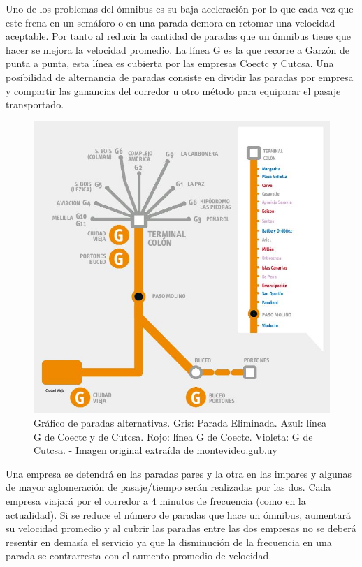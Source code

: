 Uno de los problemas del ómnibus es su baja aceleración por lo que cada vez que este frena en un semáforo o en una parada demora en retomar una velocidad aceptable. Por tanto al reducir la cantidad de paradas que un ómnibus tiene que hacer se mejora la velocidad promedio.
La línea G es la que recorre a Garzón de punta a punta, esta línea es cubierta por las empresas Coectc y Cutcsa. Una posibilidad de alternancia de paradas consiste en dividir las paradas por empresa y compartir las ganancias del corredor u otro método para equiparar el pasaje transportado. 

\begin{figure}[H]
	\centering
	\includegraphics[width=0.9\linewidth]{Figures/paradas_alternativas}
	\caption{Gráfico de paradas alternativas. Gris: Parada Eliminada. Azul: línea G de Coectc y de Cutcsa. Rojo: línea G de Coectc. Violeta: G de Cutcsa. - Imagen original extraída de montevideo.gub.uy}
	\label{fig:paradas_alternadas}
\end{figure}

Una empresa se detendrá en las paradas pares y la otra en las impares y algunas de mayor aglomeración de pasaje/tiempo serán realizadas por las dos. Cada empresa viajará por el corredor a 4 minutos de frecuencia (como en la actualidad). Si se reduce el número de paradas que hace un ómnibus, aumentará su velocidad promedio y al cubrir las paradas entre las dos empresas no se deberá resentir en demasía el servicio ya que la disminución de la frecuencia en una parada se contrarresta con el aumento promedio de velocidad.

